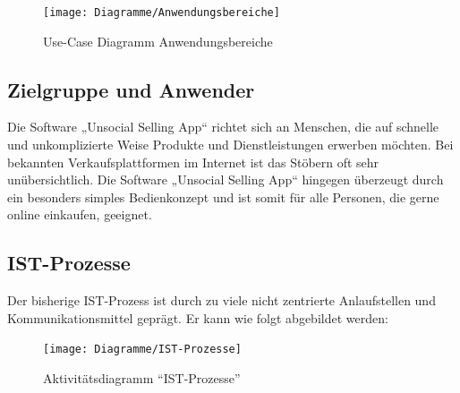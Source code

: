 \documentclass[a4paper,12pt,oneside]{scrartcl}
\begin{document}
\begin{figure}[!htbp]
\centering
\noindent\texttt{[image: Diagramme/Anwendungsbereiche]}
\caption{Use-Case Diagramm Anwendungsbereiche}
\end{figure}
\FloatBarrier


\subsection{Zielgruppe und Anwender}
Die Software „Unsocial Selling App“ richtet sich an Menschen, die auf schnelle und unkomplizierte Weise Produkte und Dienstleistungen erwerben möchten.
Bei bekannten Verkaufsplattformen im Internet ist das Stöbern oft sehr unübersichtlich.
Die Software „Unsocial Selling App“ hingegen überzeugt durch ein besonders simples Bedienkonzept und ist somit für alle Personen, die gerne online einkaufen, geeignet.


\subsection{IST-Prozesse}
Der bisherige IST-Prozess ist durch zu viele nicht zentrierte Anlaufstellen und Kommunikationsmittel geprägt.
Er kann wie folgt abgebildet werden:

\begin{figure}[!htbp]
\centering
\noindent\texttt{[image: Diagramme/IST-Prozesse]}
\caption{Aktivitätsdiagramm "`IST-Prozesse"'}
\end{figure}
\FloatBarrier
\end{document}
